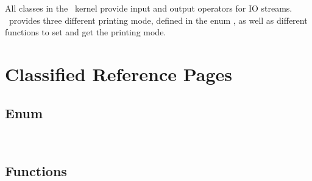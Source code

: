 

All classes in the \cgal\ kernel provide input and output operators for
IO streams.
\cgal\ provides three different printing mode, defined in the enum
, as well as different functions to set and get
the printing mode.


\section{Classified Reference Pages}

\subsection*{Enum}
 \\

\subsection*{Functions}
 \\
 \\
 \\
 \\
 \\
 \\
 \\
 \\
 \\
 \\
 \\

